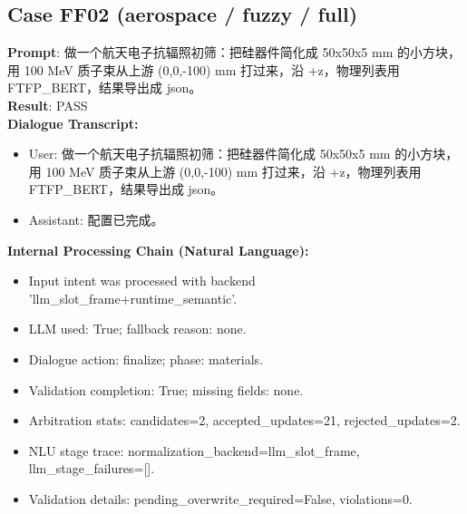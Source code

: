 \documentclass[11pt]{ctexart}
\begin{document}
\subsection{Case FF02 (aerospace / fuzzy / full)}
\textbf{Prompt}: 做一个航天电子抗辐照初筛：把硅器件简化成 50x50x5 mm 的小方块，用 100 MeV 质子束从上游 (0,0,-100) mm 打过来，沿 +z，物理列表用 FTFP\_BERT，结果导出成 json。\\
\textbf{Result}: PASS\\
\textbf{Dialogue Transcript:}
\begin{itemize}
\item User: 做一个航天电子抗辐照初筛：把硅器件简化成 50x50x5 mm 的小方块，用 100 MeV 质子束从上游 (0,0,-100) mm 打过来，沿 +z，物理列表用 FTFP\_BERT，结果导出成 json。
\item Assistant: 配置已完成。
\end{itemize}
\textbf{Internal Processing Chain (Natural Language):}
\begin{itemize}
\item Input intent was processed with backend 'llm\_slot\_frame+runtime\_semantic'.
\item LLM used: True; fallback reason: none.
\item Dialogue action: finalize; phase: materials.
\item Validation completion: True; missing fields: none.
\item Arbitration stats: candidates=2, accepted\_updates=21, rejected\_updates=2.
\item NLU stage trace: normalization\_backend=llm\_slot\_frame, llm\_stage\_failures=[].
\item Validation details: pending\_overwrite\_required=False, violations=0.
\end{itemize}
\end{document}

